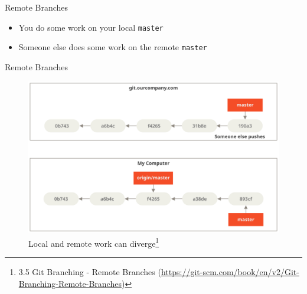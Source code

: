 \documentclass[aspectratio=169]{beamer}
\newcommand{\sectiontitle}{}
\begin{document}
\begin{frame}[fragile]{Remote Branches}{\sectiontitle}
\begin{itemize}
    \item You do some work on your local \verb|master|
    \item Someone else does some work on the remote \verb|master|
\end{itemize}
\end{frame}

\begin{frame}{Remote Branches}{\sectiontitle}
\begin{figure}
    \centering
    \includegraphics[width=\textwidth,height=0.5\textheight,keepaspectratio]{remote-branches-2}
    \caption{
        Local and remote work can diverge\footnote{
            3.5 Git Branching - Remote Branches
            (\url{https://git-scm.com/book/en/v2/Git-Branching-Remote-Branches})
        }
    }
\end{figure}
\end{frame}
\end{document}
